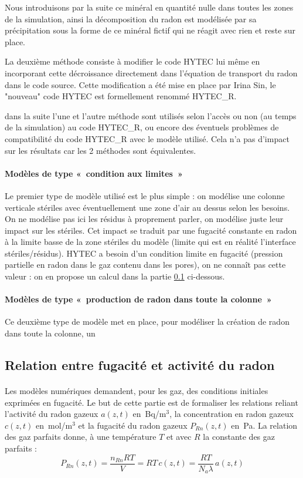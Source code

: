 \documentclass{article}
\begin{document}
Nous introduisons par la suite ce minéral en quantité nulle dans toutes les zones de la simulation, ainsi la décomposition du radon est modélisée par sa précipitation sous la forme de ce minéral fictif qui ne réagit avec rien et reste sur place.

La deuxième méthode consiste à modifier le code HYTEC lui même en incorporant cette décroissance directement dans l'équation de transport du radon dans le code source. Cette modification a été mise en place par Irina Sin, le "nouveau" code HYTEC est formellement renommé HYTEC\_R.

dans la suite l'une et l'autre méthode sont utilisés selon l'accès ou non (au temps de la simulation) au code HYTEC\_R, ou encore des éventuels problèmes de compatibilité du code HYTEC\_R avec le modèle utilisé. Cela n'a pas d'impact sur les résultats car les 2 méthodes sont équivalentes.

\paragraph{Modèles de type « condition aux limites »} Le premier type de modèle utilisé est le plus simple : on modélise une colonne verticale stériles avec éventuellement une zone d'air au dessus selon les besoins. On ne modélise pas ici les résidus à proprement parler, on modélise juste leur impact sur les stériles. Cet impact se traduit par une fugacité constante en radon à la limite basse de la zone stériles du modèle (limite qui est en réalité l'interface stériles/résidus). HYTEC a besoin d'un condition limite en fugacité (pression partielle en radon dans le gaz contenu dans les pores), on ne connaît pas cette valeur : on en propose un calcul dans la partie \ref{annexe:fug_act} ci-dessous.

\paragraph{Modèles de type « production de radon dans toute la colonne »} Ce deuxième type de modèle met en place, pour modéliser la création de radon dans toute la colonne, un

\subsection{Relation entre fugacité et activité du radon}
\label{annexe:fug_act}
\paragraph{} Les modèles numériques demandent, pour les gaz, des conditions initiales exprimées en fugacité. Le but de cette partie est de formaliser les relations reliant l’activité du radon gazeux $a(z,t)$ en~Bq/m$^3$, la concentration en radon gazeux $c(z,t)$ en~mol/m$^3$ et la fugacité du radon gazeux $P_{Rn} (z,t)$ en~Pa. La relation des gaz parfaits donne, à une température $T$ et avec $R$ la constante des gaz parfaits :
$$
P_{Rn} (z,t)=\frac{n_{Rn} RT}{V}=RT\,c(z,t)=\frac{RT}{N_a \lambda}\, a(z,t)
$$
\end{document}
